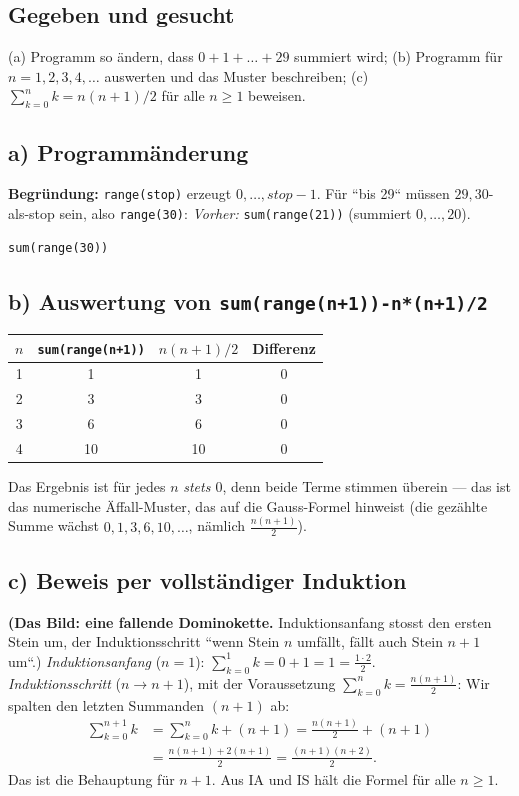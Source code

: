 

\subsection*{Gegeben und gesucht}
(a) Programm so ändern, dass $0+1+\dots+29$ summiert wird; (b) Programm
für $n=1,2,3,4,\dots$ auswerten und das Muster beschreiben; (c)
$\sum_{k=0}^{n}k=n(n+1)/2$ für alle $n\ge1$ beweisen.

\subsection*{a) Programmänderung}
\textbf{Begründung:} \texttt{range(stop)} erzeugt $0,\dots,stop-1$.
Für ``bis 29`` müssen $29,30$-als-stop sein, also \texttt{range(30)}:
\emph{Vorher:} \texttt{sum(range(21))} (summiert $0,\dots,20$).
\begin{verbatim}
sum(range(30))
\end{verbatim}

\subsection*{b) Auswertung von \texttt{sum(range(n+1))-n*(n+1)/2}}
\begin{center}
\begin{tabular}{c|c|c|c}
$n$ & \texttt{sum(range(n+1))} & $n(n+1)/2$ & Differenz\\
\hline
1 & 1 & 1 & 0\\
2 & 3 & 3 & 0\\
3 & 6 & 6 & 0\\
4 & 10 & 10 & 0
\end{tabular}
\end{center}
Das Ergebnis ist für jedes $n$ \emph{stets $0$}, denn beide Terme
stimmen überein --- das ist das numerische \"Affall-Muster, das auf die
Gauss-Formel hinweist (die gezählte Summe w\"achst $0,1,3,6,10,\dots$,
nämlich $\frac{n(n+1)}2$).

\subsection*{c) Beweis per vollständiger Induktion}
\textbf{(Das Bild: eine fallende Dominokette.} Induktionsanfang stosst den
ersten Stein um, der Induktionsschritt ``wenn Stein $n$ umf\"allt, f\"allt
auch Stein $n+1$ um``.)
\emph{Induktionsanfang} ($n=1$): $\sum_{k=0}^{1}k=0+1=1=\frac{1\cdot2}2$. \\
\emph{Induktionsschritt} ($n\to n+1$), mit der Voraussetzung
$\sum_{k=0}^{n}k=\frac{n(n+1)}2$: Wir spalten den letzten Summanden
$(n+1)$ ab:
\begin{align}
  \sum_{k=0}^{n+1}k &=\sum_{k=0}^{n}k+(n+1)
  =\frac{n(n+1)}2+(n+1) \\
  &=\frac{n(n+1)+2(n+1)}2=\frac{(n+1)(n+2)}2 .
\end{align}
Das ist die Behauptung für $n+1$. Aus IA und IS hält die Formel für alle
$n\ge1$.

